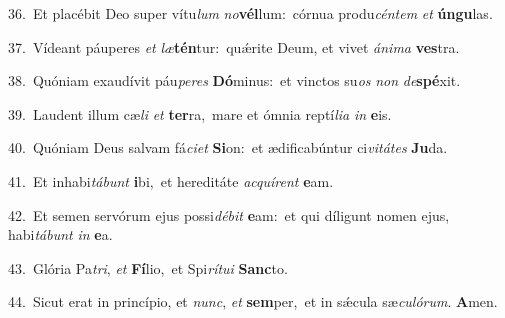 {\numbfont\textcolor{\numbcolor}{36.}}~Et placébit Deo super vítu\textit{lum} \textit{no}\-\textbf{vél}lum:~\star córnua produ\-\textit{cén}\-\textit{tem} \textit{et} \textbf{ún}\-\textbf{gu}las.\par
{\numbfont\textcolor{\numbcolor}{37.}}~Vídeant páuperes \textit{et} \textit{læ}\-\textbf{tén}tur:~\star quǽrite Deum, et vivet \textit{á}\-\textit{ni}\textit{ma} \textbf{ves}\-tra.\par
{\numbfont\textcolor{\numbcolor}{38.}}~Quóniam exaudívit páu\-\textit{pe}\-\textit{res} \textbf{Dó}\-minus:~\star et vinctos su\textit{os} \textit{non} \textit{de}\-\textbf{spé}xit.\par
{\numbfont\textcolor{\numbcolor}{39.}}~Laudent illum cæ\textit{li} \textit{et} \textbf{ter}\-ra,~\star mare et ómnia reptí\-\textit{li}\-\textit{a} \textit{in} \textbf{e}\-is.\par
{\numbfont\textcolor{\numbcolor}{40.}}~Quóniam Deus salvam fá\-\textit{ci}\-\textit{et} \textbf{Si}\-on:~\star et ædificabúntur ci\-\textit{vi}\-\textit{tá}\textit{tes} \textbf{Ju}\-da.\par
{\numbfont\textcolor{\numbcolor}{41.}}~Et inhabi\-\textit{tá}\-\textit{bunt} \textbf{i}\-bi,~\star et hereditáte \textit{ac}\-\textit{quí}\textit{rent} \textbf{e}\-am.\par
{\numbfont\textcolor{\numbcolor}{42.}}~Et semen servórum ejus possi\-\textit{dé}\-\textit{bit} \textbf{e}\-am:~\star et qui díligunt nomen ejus, habi\-\textit{tá}\-\textit{bunt} \textit{in} \textbf{e}\-a.\par
{\numbfont\textcolor{\numbcolor}{43.}}~Glória Pa\-\textit{tri}\-, \textit{et} \textbf{Fí}\-lio,~\star et Spi\-\textit{rí}\-\textit{tu}\textit{i} \textbf{Sanc}\-to.\par
{\numbfont\textcolor{\numbcolor}{44.}}~Sicut erat in princípio, et \textit{nunc}\-, \textit{et} \textbf{sem}\-per,~\star et in sǽcula sæ\-\textit{cu}\-\textit{ló}\textit{rum}. \textbf{A}\-men.\par

